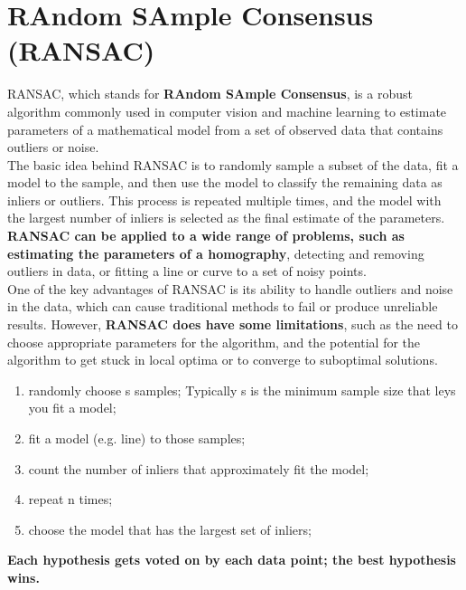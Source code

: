 \documentclass{article}
\begin{document}
\newpage

\section*{RAndom SAmple Consensus (RANSAC)}

RANSAC, which stands for \textbf{RAndom SAmple Consensus}, is a robust algorithm commonly used in computer vision and machine learning to estimate parameters of a mathematical model from a set of observed data that contains outliers or noise. \\

The basic idea behind RANSAC is to randomly sample a subset of the data, fit a model to the sample, and then use the model to classify the remaining data as inliers or outliers. This process is repeated multiple times, and the model with the largest number of inliers is selected as the final estimate of the parameters. \\

\textbf{RANSAC can be applied to a wide range of problems, such as estimating the parameters of a homography}, detecting and removing outliers in data, or fitting a line or curve to a set of noisy points. \\

One of the key advantages of RANSAC is its ability to handle outliers and noise in the data, which can cause traditional methods to fail or produce unreliable results. However, \textbf{RANSAC does have some limitations}, such as the need to choose appropriate parameters for the algorithm, and the potential for the algorithm to get stuck in local optima or to converge to suboptimal solutions.

\begin{enumerate}
    \item randomly choose s samples; Typically s is the minimum sample size that leys you fit a model;
    \item fit a model (e.g. line) to those samples;
    \item count the number of inliers that approximately fit the model;
    \item repeat n times;
    \item choose the model that has the largest set of inliers;
\end{enumerate}

\textbf{Each hypothesis gets voted on by each data point; the best hypothesis wins.}

\newpage
\end{document}
